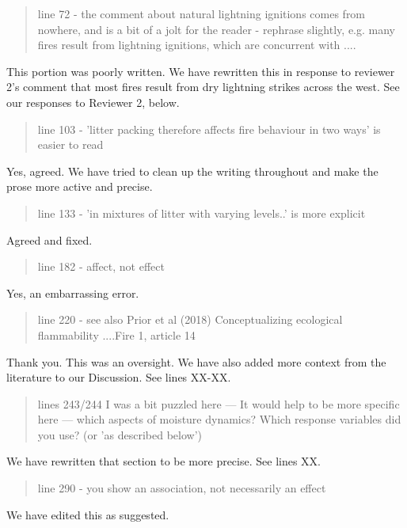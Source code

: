 \documentclass[letterpaper, 12pt]{letter}
\begin{document}
\begin{letter}{}
\begin{quote}
line 72 - the comment about natural lightning ignitions comes from nowhere, and is a  bit of a jolt for the reader - rephrase slightly, e.g. many fires result from lightning ignitions, which are concurrent with ....
\end{quote}

This portion was poorly written. We have rewritten this in response to reviewer 2's comment that most fires result from dry lightning strikes across the west. See our responses to Reviewer 2, below.

\begin{quote}
line 103 - 'litter packing therefore affects fire behaviour in two ways' is easier to read
\end{quote}

Yes, agreed. We have tried to clean up the writing throughout and make the prose more active and precise.

\begin{quote}
line 133 - 'in mixtures of litter with varying levels..' is more explicit
\end{quote}

Agreed and fixed.

\begin{quote}
line 182 - affect, not effect
\end{quote}

Yes, an embarrassing error.

\begin{quote}
line 220 - see also Prior et al (2018)  Conceptualizing ecological flammability ....Fire 1, article 14
\end{quote}

Thank you. This was an oversight. We have also added more context from the
literature to our Discussion. See lines XX-XX.


\begin{quote}
lines 243/244 I was a bit puzzled here --- It would help to be more specific here --- which aspects of moisture dynamics? Which response variables did you use?  (or 'as described below')
\end{quote}

We have rewritten that section to be more precise.  See lines XX.

\begin{quote}
line 290 - you show an association, not necessarily an effect
\end{quote}

We have edited this as suggested.


\end{letter}
\end{document}
